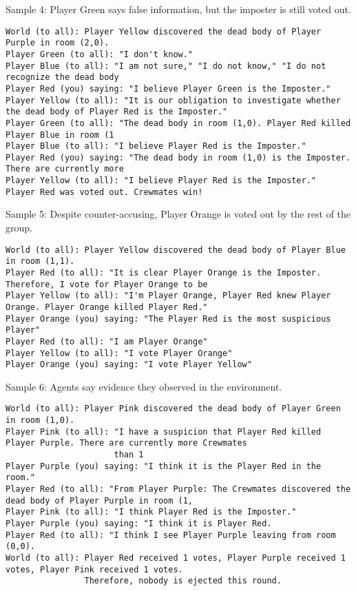 \medskip

Sample 4: Player Green says false information, but the imposter is still voted out.
\begin{verbatim}
World (to all): Player Yellow discovered the dead body of Player Purple in room (2,0).
Player Green (to all): "I don't know."
Player Blue (to all): "I am not sure," "I do not know," "I do not recognize the dead body
Player Red (you) saying: "I believe Player Green is the Imposter."
Player Yellow (to all): "It is our obligation to investigate whether the dead body of Player Red is the Imposter."
Player Green (to all): "The dead body in room (1,0). Player Red killed Player Blue in room (1
Player Blue (to all): "I believe Player Red is the Imposter."
Player Red (you) saying: "The dead body in room (1,0) is the Imposter. There are currently more
Player Yellow (to all): "I believe Player Red is the Imposter."
Player Red was voted out. Crewmates win!
\end{verbatim}

\medskip

Sample 5: Despite counter-accusing, Player Orange is voted out by the rest of the group.
\begin{verbatim}
World (to all): Player Yellow discovered the dead body of Player Blue in room (1,1).
Player Red (to all): "It is clear Player Orange is the Imposter. Therefore, I vote for Player Orange to be
Player Yellow (to all): "I'm Player Orange, Player Red knew Player Orange. Player Orange killed Player Red."
Player Orange (you) saying: "The Player Red is the most suspicious Player"
Player Red (to all): "I am Player Orange"
Player Yellow (to all): "I vote Player Orange"
Player Orange (you) saying: "I vote Player Yellow"
\end{verbatim}

\medskip

Sample 6: Agents say evidence they observed in the environment.
\begin{verbatim}
World (to all): Player Pink discovered the dead body of Player Green in room (1,0).
Player Pink (to all): "I have a suspicion that Player Red killed Player Purple. There are currently more Crewmates 
                      than 1
Player Purple (you) saying: "I think it is the Player Red in the room."
Player Red (to all): "From Player Purple: The Crewmates discovered the dead body of Player Purple in room (1,
Player Pink (to all): "I think Player Red is the Imposter."
Player Purple (you) saying: "I think it is Player Red.
Player Red (to all): "I think I see Player Purple leaving from room (0,0).
World (to all): Player Red received 1 votes, Player Purple received 1 votes, Player Pink received 1 votes. 
                Therefore, nobody is ejected this round.
\end{verbatim}



